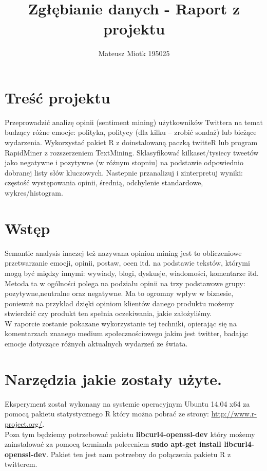 \documentclass[12pt,a4paper]{report}
\author{Mateusz Miotk 195025}
\title{Zgłębianie danych - Raport z projektu}
\begin{document}
\maketitle
\newpage
\tableofcontents
\newpage
\section[Treść projektu] {Treść projektu}
Przeprowadzić analizę opinii (sentiment mining) użytkowników Twittera na temat 
budzący różne emocje: polityka, politycy (dla kilku – zrobić sondaż) lub bieżące 
wydarzenia. Wykorzystać pakiet R z doinstalowaną paczką twitteR lub program 
RapidMiner z rozszerzeniem TextMining. Sklasyfikować kilkaset/tysiecy tweetów jako 
negatywne i pozytywne (w różnym stopniu) na podstawie odpowiednio dobranej listy 
słów kluczowych. Nastepnie przanalizuj i zinterpretuj wyniki: częstość występowania 
opinii, średnią, odchylenie standardowe, wykres/histogram.
\section[Krótki wstęp dotyczący projektu i jego zastosowania] {Wstęp}
Semantic analysis inaczej też nazywana opinion mining jest to obliczeniowe przetwarzanie emocji, opinii, postaw, ocen itd. na podstawie tekstów, którymi mogą być między innymi: wywiady, blogi, dyskusje, wiadomości, komentarze itd. \\
Metoda ta w ogólności polega na podziału opinii na trzy podstawowe grupy: pozytywne,neutralne oraz negatywne. Ma to ogromny wpływ w biznesie, ponieważ na przykład dzięki opiniom klientów danego produktu możemy stwierdzić czy produkt ten spełnia oczekiwania, jakie założyliśmy.\\
W raporcie zostanie pokazane wykorzystanie tej techniki, opierając się na komentarzach znanego medium społecznościowego jakim jest twitter, badając emocje dotyczące różnych aktualnych wydarzeń ze świata. \\
\section[Narzędzia jakie zostały użyte] {Narzędzia jakie zostały użyte.}
Eksperyment został wykonany na systemie operacyjnym Ubuntu 14.04 x64 za pomocą pakietu statystycznego R który można pobrać ze strony: \url{http://www.r-project.org/}.\\
Poza tym będziemy potrzebować pakietu \textbf{libcurl4-openssl-dev} który możemy zainstalować za pomocą terminala poleceniem \textbf{sudo apt-get install libcurl4-openssl-dev}. Pakiet ten jest nam potrzebny do połączenia pakietu R z twitterem. 
\end{document}
